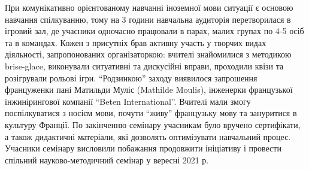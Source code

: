 При комунікативно орієнтованому навчанні іноземної мови ситуації є основою
навчання спілкуванню, тому на 3 години навчальна аудиторія перетворилася в
ігровий зал, де учасники одночасно працювали в парах, малих групах по 4-5 осіб
та в командах. Кожен з присутніх брав активну участь у творчих видах
діяльності, запропонованих організаторкою: вчителі знайомилися з методикою
brise-glace, виконували ситуативні та дискусійні вправи, проходили квізи та
розігрували рольові ігри. \enquote{Родзинкою} заходу виявилося запрошення француженки
пані Матильди Муліс (Mathilde Moulis), інженерки французької інжинірингової
компанії \enquote{Beten International}. Вчителі мали змогу поспілкуватися з носієм
мови, почути \enquote{живу} французьку мову та зануритися в культуру Франції. По
закінченню семінару учасникам було вручено сертифікати, а також дидактичні
матеріали, які дозволять оптимізувати навчальний процес. Учасники семінару
висловили побажання продовжити ініціативу і провести спільний
науково-методичний семінар у вересні 2021 р.


